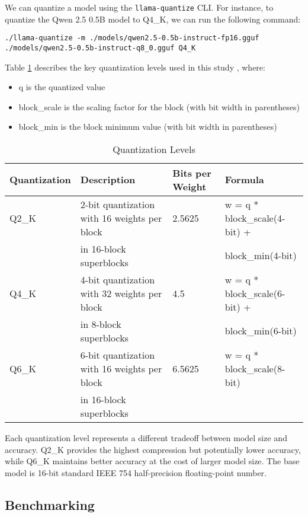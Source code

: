 We can quantize a model using the \texttt{llama-quantize} CLI. For instance, to quantize the Qwen 2.5 0.5B model to Q4\_K, we can run the following command:
\begin{verbatim}
./llama-quantize -m ./models/qwen2.5-0.5b-instruct-fp16.gguf ./models/qwen2.5-0.5b-instruct-q8_0.gguf Q4_K
\end{verbatim}

Table \ref{tab:quantization-levels} describes the key quantization levels used in this study , where:
\begin{itemize}
\item q is the quantized value
\item block\_scale is the scaling factor for the block (with bit width in parentheses)
\item block\_min is the block minimum value (with bit width in parentheses)
\end{itemize}

\begin{table}[H]
\centering
\caption{Quantization Levels}
\label{tab:quantization-levels}
\begin{tabular}{llll}
\toprule
Quantization & Description & Bits per Weight & Formula \\
\midrule
Q2\_K & 2-bit quantization with 16 weights per block & 2.5625 & w = q * block\_scale(4-bit) + \\
      & in 16-block superblocks & & block\_min(4-bit) \\
Q4\_K & 4-bit quantization with 32 weights per block & 4.5 & w = q * block\_scale(6-bit) + \\
      & in 8-block superblocks & & block\_min(6-bit) \\
Q6\_K & 6-bit quantization with 16 weights per block & 6.5625 & w = q * block\_scale(8-bit) \\
      & in 16-block superblocks & & \\
\bottomrule
\end{tabular}
\end{table}

Each quantization level represents a different tradeoff between model size and accuracy. Q2\_K provides the highest compression but potentially lower accuracy, while Q6\_K maintains better accuracy at the cost of larger model size. The base model is 16-bit standard IEEE 754 half-precision floating-point number.

\subsection{Benchmarking}

